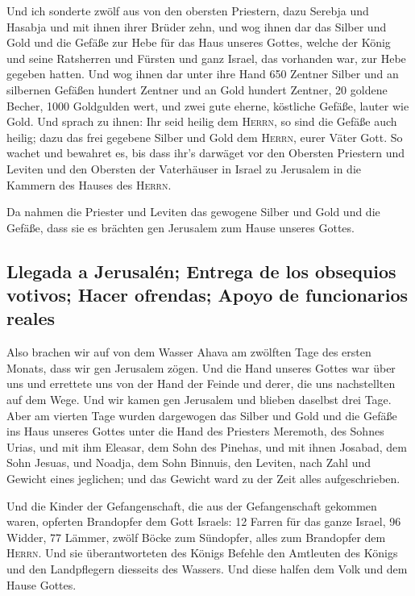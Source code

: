  Und ich sonderte zwölf aus von den obersten Priestern,
dazu Serebja und Hasabja und mit ihnen ihrer Brüder zehn,
 und wog ihnen dar das Silber und Gold und die Gefäße zur
Hebe für das Haus unseres Gottes, welche der König und seine Ratsherren
und Fürsten und ganz Israel, das vorhanden war, zur Hebe gegeben hatten.
 Und wog ihnen dar unter ihre Hand 650 Zentner Silber und
an silbernen Gefäßen hundert Zentner und an Gold hundert Zentner,
 20 goldene Becher, 1000 Goldgulden wert, und zwei gute
eherne, köstliche Gefäße, lauter wie Gold.  Und sprach zu
ihnen: Ihr seid heilig dem \textsc{Herrn}, so sind die Gefäße auch
heilig; dazu das frei gegebene Silber und Gold dem \textsc{Herrn}, eurer
Väter Gott.  So wachet und bewahret es, bis dass ihr's
darwäget vor den Obersten Priestern und Leviten und den Obersten der
Vaterhäuser in Israel zu Jerusalem in die Kammern des Hauses des
\textsc{Herrn}.

 Da nahmen die Priester und Leviten das gewogene Silber
und Gold und die Gefäße, dass sie es brächten gen Jerusalem zum Hause
unseres Gottes.

\hypertarget{llegada-a-jerusaluxe9n-entrega-de-los-obsequios-votivos-hacer-ofrendas-apoyo-de-funcionarios-reales}{%
\subsection{Llegada a Jerusalén; Entrega de los obsequios votivos; Hacer
ofrendas; Apoyo de funcionarios
reales}\label{llegada-a-jerusaluxe9n-entrega-de-los-obsequios-votivos-hacer-ofrendas-apoyo-de-funcionarios-reales}}

 Also brachen wir auf von dem Wasser Ahava am zwölften
Tage des ersten Monats, dass wir gen Jerusalem zögen. Und die Hand
unseres Gottes war über uns und errettete uns von der Hand der Feinde
und derer, die uns nachstellten auf dem Wege.  Und wir
kamen gen Jerusalem und blieben daselbst drei Tage.  Aber
am vierten Tage wurden dargewogen das Silber und Gold und die Gefäße ins
Haus unseres Gottes unter die Hand des Priesters Meremoth, des Sohnes
Urias, und mit ihm Eleasar, dem Sohn des Pinehas, und mit ihnen Josabad,
dem Sohn Jesuas, und Noadja, dem Sohn Binnuis, den Leviten,
 nach Zahl und Gewicht eines jeglichen; und das Gewicht
ward zu der Zeit alles aufgeschrieben.

 Und die Kinder der Gefangenschaft, die aus der
Gefangenschaft gekommen waren, opferten Brandopfer dem Gott Israels: 12
Farren für das ganze Israel, 96 Widder, 77 Lämmer, zwölf Böcke zum
Sündopfer, alles zum Brandopfer dem \textsc{Herrn}.  Und
sie überantworteten des Königs Befehle den Amtleuten des Königs und den
Landpflegern diesseits des Wassers. Und diese halfen dem Volk und dem
Hause Gottes.

